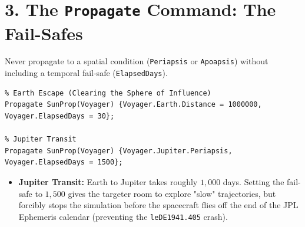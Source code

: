 \documentclass[11pt, letterpaper]{article}
\begin{document}
\section*{3. The \texttt{Propagate} Command: The Fail-Safes}
Never propagate to a spatial condition (\texttt{Periapsis} or \texttt{Apoapsis}) without including a temporal fail-safe (\texttt{ElapsedDays}).

\begin{lstlisting}
% Earth Escape (Clearing the Sphere of Influence)
Propagate SunProp(Voyager) {Voyager.Earth.Distance = 1000000, Voyager.ElapsedDays = 30};

% Jupiter Transit
Propagate SunProp(Voyager) {Voyager.Jupiter.Periapsis, Voyager.ElapsedDays = 1500};
\end{lstlisting}
\begin{itemize}
    \item \textbf{Jupiter Transit:} Earth to Jupiter takes roughly $1,000$ days. Setting the fail-safe to $1,500$ gives the targeter room to explore "slow" trajectories, but forcibly stops the simulation before the spacecraft flies off the end of the JPL Ephemeris calendar (preventing the \texttt{leDE1941.405} crash).
\end{itemize}
\end{document}
